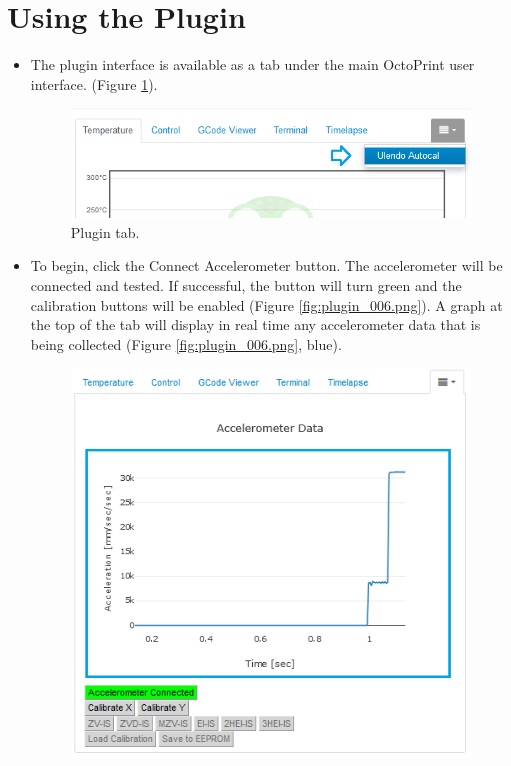 \documentclass[12pt]{article}
\begin{document}
\section{Using the Plugin}
\begin{itemize}
	\item The plugin interface is available as a tab under the main OctoPrint user interface. (Figure \ref{fig:plugin_005.png}).
		\begin{figure}[H]
			\centering
			\includegraphics{plugin_005.png}
			\caption{Plugin tab.}
			\label{fig:plugin_005.png}
		\end{figure}
	\item To begin, click the Connect Accelerometer button. The accelerometer will be connected and tested. If successful, the button will turn green and the calibration buttons will be enabled (Figure \ref{fig:plugin_006.png}). A graph at the top of the tab will display in real time any accelerometer data that is being collected (Figure \ref{fig:plugin_006.png}, blue).
		\begin{figure}[H]
			\centering
			\includegraphics{plugin_006.png}

\end{figure}
\end{itemize}
\end{document}
